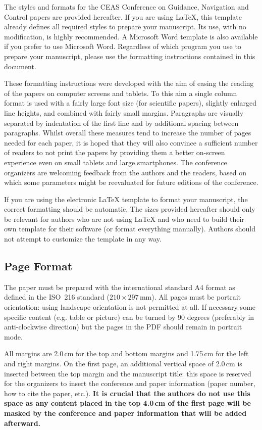 \documentclass{CEAS_EuroGNC_2024}
\begin{document}
The styles and formats for the CEAS Conference on Guidance, Navigation and Control papers are provided hereafter. If you are using \LaTeX{}, this template already defines all required styles to prepare your manuscript. Its use, with no modification, is highly recommended. A Microsoft Word template is also available if you prefer to use Microsoft Word. Regardless of which program you use to prepare your manuscript, please use the formatting instructions contained in this document.

These formatting instructions were developed with the aim of easing the reading of the papers on computer screens and tablets. To this aim a single column format is used with a fairly large font size (for scientific papers), slightly enlarged line heights, and combined with fairly small margins. Paragraphs are visually separated by indentation of the first line and by additional spacing between paragraphs. Whilst overall these measures tend to increase the number of pages needed for each paper, it is hoped that they will also convince a sufficient number of readers to not print the papers by providing them a better on-screen experience even on small tablets and large smartphones. The conference organizers are welcoming feedback from the authors and the readers, based on which some parameters might be reevaluated for future editions of the conference.

If you are using the electronic \LaTeX{} template to format your manuscript, the correct formatting should be automatic. The sizes provided hereafter should only be relevant for authors who are not using \LaTeX{} and who need to build their own template for their software (or format everything manually). Authors should not attempt to customize the template in any way.


\subsection{Page Format}

The paper must be prepared with the international standard A4 format as defined in the ISO~216 standard ($210\times 297$\,mm). All pages must be portrait orientation: using landscape orientation is not permitted at all. If necessary some specific content (e.g. table or picture) can be turned by 90 degrees (preferably in anti-clockwise direction) but the pages in the PDF should remain in portrait mode.

All margins are 2.0\,cm for the top and bottom margins and 1.75\,cm for the left and right margins. On the first page, an additional vertical space of 2.0\,cm is inserted between the top margin and the manuscript title: this space is reserved for the organizers to insert the conference and paper information (paper number, how to cite the paper, etc.). \textbf{It is crucial that the authors do not use this space as any content placed in the top 4.0\,cm of the first page will be masked by the conference and paper information that will be added afterward.}
\end{document}
